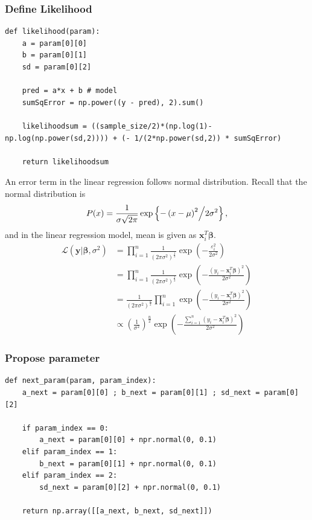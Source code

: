 \documentclass[a4paper,10.5pt,uplatex]{jsarticle}  %
\begin{document}
\subsubsection{Define Likelihood}
\begin{lstlisting}
def likelihood(param):
    a = param[0][0]
    b = param[0][1]
    sd = param[0][2]
    
    pred = a*x + b # model
    sumSqError = np.power((y - pred), 2).sum()
    
    likelihoodsum = ((sample_size/2)*(np.log(1)-np.log(np.power(sd,2)))) + (- 1/(2*np.power(sd,2)) * sumSqError)
    
    return likelihoodsum
\end{lstlisting}
An error term in the linear regression follows normal distribution. Recall that the normal distribution is $$P(x) = \frac{1}{{\sigma \sqrt {2\pi } }} \exp\left\{  {{{ - \left( {x - \mu } \right)^2 } \mathord{\left/ {\vphantom {{ - \left( {x - \mu } \right)^2 } {2\sigma ^2 }}} \right. \kern-\nulldelimiterspace} {2\sigma ^2 }}}  \right\},$$ and in the linear regression model, mean is given as $\mathbf{x}_i^T \boldsymbol{\beta}$. 
\begin{align}
  \mathcal{L}(\mathbf{y}|\boldsymbol{\beta}, \sigma^2) &= \prod_{i=1}^{n} \frac{1}{(2 \pi \sigma^2)^{\frac{1}{2}}} \exp \left( - \frac{\varepsilon_i^2}{2 \sigma^2}  \right) \\[10pt]
                                                       &= \prod_{i=1}^{n} \frac{1}{(2 \pi \sigma^2)^{\frac{1}{2}}} \exp \left( - \frac{(y_i - \mathbf{x}_i^T \boldsymbol{\beta})^2}{2 \sigma^2}  \right) \\[10pt]
 &= \frac{1}{(2 \pi \sigma^2)^{\frac{n}{2}}} \prod_{i=1}^{n}  \exp \left( - \frac{(y_i - \mathbf{x}_i^T \boldsymbol{\beta})^2}{2 \sigma^2}  \right) \\[10pt]
                                                       &\propto \left( \frac{1}{\sigma^2} \right)^{\frac{n}{2}} \exp \left( - \frac{\sum_{i=1}^{n} (y_i - \mathbf{x}_i^T \boldsymbol{\beta})^2 }{2 \sigma^2} \right)
\end{align}

\subsubsection{Propose parameter}
\begin{lstlisting}[caption={Draw a parameter one by one}]
def next_param(param, param_index):
    a_next = param[0][0] ; b_next = param[0][1] ; sd_next = param[0][2]
    
    if param_index == 0:
        a_next = param[0][0] + npr.normal(0, 0.1)
    elif param_index == 1:
        b_next = param[0][1] + npr.normal(0, 0.1)
    elif param_index == 2:
        sd_next = param[0][2] + npr.normal(0, 0.1)
        
    return np.array([[a_next, b_next, sd_next]])
\end{lstlisting}
\end{document}
